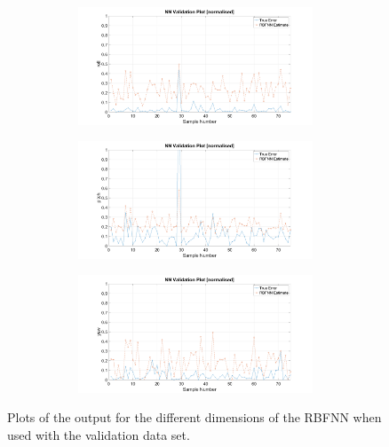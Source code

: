 \begin{figure}
\begin{subfigure}{0.48\textwidth}
\begin{subfigure}{\textwidth}
    \end{subfigure}
    \caption{}
  \end{subfigure}
  \begin{subfigure}{0.48\textwidth}
    \begin{subfigure}{\textwidth}
      \includegraphics[clip, trim = 100 0 100 0, width=\textwidth]{figures/chapter4/v_roll}
    \end{subfigure}
    \begin{subfigure}{\textwidth}
      \includegraphics[clip, trim = 100 0 100 0, width=\textwidth]{figures/chapter4/v_pitch}
    \end{subfigure}
    \begin{subfigure}{\textwidth}
      \includegraphics[clip, trim = 100 0 100 0, width=\textwidth]{figures/chapter4/v_yaw}
    \end{subfigure}
    \caption{}
  \end{subfigure}
  \caption[The output of the RBFNN with the validation set input.]{Plots of the output for the different dimensions of the RBFNN when used with the validation data set.}
  \label{fig:chap4-rbf-valid}
\end{figure}

